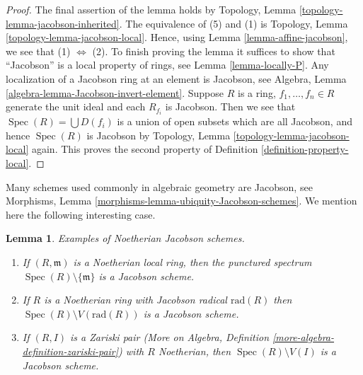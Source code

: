 \documentclass{stacks-project}
\theoremstyle{plain}
\newtheorem{lemma}[subsection]{Lemma}
\theoremstyle{definition}
\theoremstyle{remark}
\numberwithin{equation}{subsection}
\def\Spec{\mathop{\mathrm{Spec}}}
\begin{document}
\begin{proof}
The final assertion of the lemma holds by
Topology, Lemma \ref{topology-lemma-jacobson-inherited}.
The equivalence of (5) and (1) is
Topology, Lemma \ref{topology-lemma-jacobson-local}.
Hence, using Lemma \ref{lemma-affine-jacobson},
we see that (1) $\Leftrightarrow$ (2).
To finish proving the lemma it suffices to show that ``Jacobson''
is a local property of rings, see Lemma \ref{lemma-locally-P}.
Any localization of a Jacobson ring at an element is Jacobson, see
Algebra, Lemma \ref{algebra-lemma-Jacobson-invert-element}.
Suppose $R$ is a ring, $f_1, \ldots, f_n \in R$ generate the unit
ideal and each $R_{f_i}$ is Jacobson. Then we see that
$\Spec(R) = \bigcup D(f_i)$ is a union of open subsets
which are all Jacobson, and hence $\Spec(R)$ is Jacobson
by Topology, Lemma \ref{topology-lemma-jacobson-local} again.
This proves the second property of Definition \ref{definition-property-local}.
\end{proof}

\noindent
Many schemes used commonly in algebraic geometry are Jacobson, see
Morphisms, Lemma \ref{morphisms-lemma-ubiquity-Jacobson-schemes}.
We mention here the following interesting case.

\begin{lemma}
\label{lemma-complement-closed-point-Jacobson}
Examples of Noetherian Jacobson schemes.
\begin{enumerate}
\item If $(R, \mathfrak m)$ is a Noetherian local ring, then
the punctured spectrum $\Spec(R) \setminus \{\mathfrak m\}$
is a Jacobson scheme.
\item If $R$ is a Noetherian ring with Jacobson radical $\text{rad}(R)$
then $\Spec(R) \setminus V(\text{rad}(R))$ is a Jacobson scheme.
\item If $(R, I)$ is a Zariski pair (More on Algebra, Definition
\ref{more-algebra-definition-zariski-pair})
with $R$ Noetherian, then $\Spec(R) \setminus V(I)$ is a
Jacobson scheme.
\end{enumerate}
\end{lemma}
\end{document}
